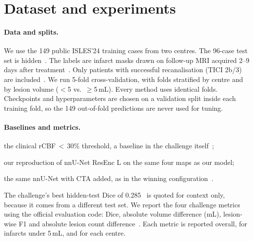 \section{Dataset and experiments}
\label{sec:experiments}

\paragraph{Data and splits.}
We use the 149 public ISLES'24 training cases from two centres. The 96-case test set is hidden~\cite{riedel2026isles24dataset}. The labels are infarct masks drawn on follow-up MRI acquired 2--9 days after treatment~\cite{riedel2026isles24dataset}. Only patients with successful recanalisation (TICI 2b/3) are included~\cite{delarosa2024isles24}. We run 5-fold cross-validation, with folds stratified by centre and by lesion volume ($<$5 vs.\ $\geq$5\,mL). Every method uses identical folds. Checkpoints and hyperparameters are chosen on a validation split inside each training fold, so the 149 out-of-fold predictions are never used for tuning.

\paragraph{Baselines and metrics.}
\begin{enumerate*}[label=(B\arabic*), start=0]
  \item the clinical rCBF\,$<$\,30\% threshold, a baseline in the challenge itself~\cite{delarosa2024isles24};
  \item our reproduction of nnU-Net ResEnc L on the same four maps as our model;
  \item the same nnU-Net with CTA added, as in the winning configuration~\cite{ren2025isles24}.
\end{enumerate*}
The challenge's best hidden-test Dice of 0.285~\cite{delarosa2024isles24} is quoted for context only, because it comes from a different test set. We report the four challenge metrics using the official evaluation code: Dice, absolute volume difference (mL), lesion-wise F1 and absolute lesion count difference~\cite{delarosa2024isles24}. Each metric is reported overall, for infarcts under 5\,mL, and for each centre.

